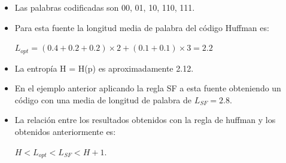 \documentclass{beamer}
\newtheorem{teorema} [Teorema] {Teorema}
\newtheorem{lema} [theorem] {Lema}
\begin{document}
\begin{frame}  \small

\begin{itemize}
\item Las palabras codificadas son 00, 01, 10, 110, 111. 
\item Para esta fuente la longitud media de palabra del código Huffman es:
\begin{center}
$L_{opt}=(0.4+0.2+0.2) \times 2 + (0.1+0.1) \times 3=2.2$
\end{center}

\item La entropía H = H(p) es aproximadamente 2.12. 

\item En el ejemplo anterior aplicando la regla SF a esta fuente obteniendo un código con una media de longitud de palabra de $L_{SF} = 2.8$.

\item La relación entre los resultados obtenidos con la regla de huffman y los obtenidos anteriormente es: 
\begin{center}
$H < L_{opt}< L_{SF} < H+1.$
\end{center}

\end{itemize}

\end{frame} 




\end{document}
